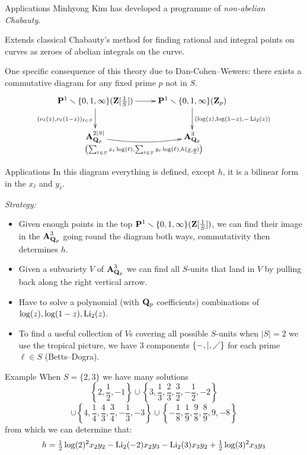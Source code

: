 \begin{frame}{Applications}
    Minhyong Kim has developed a programme of \emph{non-abelian Chabauty}.

    Extends classical Chabauty's method for finding rational and integral points on curves as zeroes of abelian integrals on the curve.\pause

    One specific consequence of this theory due to Dan-Cohen--Wewers: there exists a commutative diagram for any fixed prime $p$ not in $S$.
    \[\xymatrix{
            \mathbf P^1\smallsetminus\{0,1,\infty\}(\mathbf Z \lb  \frac 1 S \rb )\ar[d]_{(\nu_\ell(z), \nu_\ell(1-z))_{\ell\in S}} \ar[r] & \mathbf P^1\smallsetminus\{0,1,\infty\}(\mathbf Z_p ) \ar[d]^{(\log(z), \log(1-z), -\Li_2(z))} \\
            \aff_{\QQ_p}^{2|S|} \ar@/_/@{->}[r]_{\left(\sum_{\ell \in S} x_\ell \log(\ell),\sum_{\ell \in S} y_\ell \log(\ell), h(\underline x, \underline y)\right)}  & \aff_{\QQ_p}^{3} 
    }\]
\end{frame}

\begin{frame}{Applications}
    In this diagram everything is defined, except $h$, it is a bilinear  form in the $x_\ell$ and $y_\ell$.

    \emph{Strategy:}
    \begin{itemize}
        \item Given enough points in the top $\mathbf P^1\smallsetminus\{0,1,\infty\}(\mathbf Z [  \frac 1 S ] )$, we can find their image in the $\operatorname{\mathbf{A}}^3_{\mathbf Q_p}$ going round the diagram both ways, commutativity then determines $h$.
        \item Given a subvariety $V$ of $\operatorname{\mathbf{A}}^3_{\mathbf Q_p}$ we can find all $S$-units that land in $V$ by pulling back along the right vertical arrow.\pause
        \item Have to solve a polynomial (with $\mathbf Q_p$ coefficients) combinations of $\log(z), \log(1-z),\operatorname{Li}_2(z)$.
        \item To find a useful collection of $V$s covering all possible $S$-units when $|S| =2$ we use the tropical picture, we have 3 components $\{-, |, \diagup\}$ for each prime $\ell \in S$ (Betts--Dogra).
    \end{itemize}
\end{frame}

\begin{frame}[fragile]{Example}
    When $S=\{2,3\}$ we have many solutions
    \[\left\{2, \frac{1}{2}, -1\right\}\cup\left\{ 3,\frac{1}{3},\frac{2}{3}, \frac{3}{2}, -\frac{1}{2}, -2 \right\}\]\[\cup\left\{ 4, \frac{1}{4},  \frac{4}{3},  \frac{3}{4}, -\frac{1}{3},  -3 \right\}\cup\left\{ -\frac{1}{8}, \frac{1}{9}, \frac{9}{8}, \frac{8}{9},9,  -8\right\}\]
    from which we can determine that:
    \[ h =    \tfrac12 \log(2)^2 x_2 y_2 -\operatorname{Li}_2(-2) x_2 y_3 -\operatorname{Li}_2(3)x_3 y_2 + \tfrac12 \log(3)^2 x_3 y_3 \]
\end{frame}

